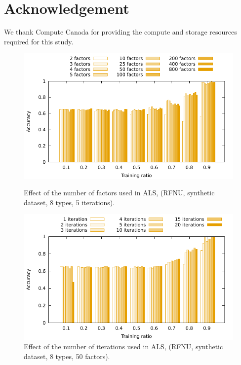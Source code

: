 \documentclass[10pt, conference, compsocconf]{IEEEtran}
\begin{document}
\section*{Acknowledgement}

We thank Compute Canada for providing the compute and storage resources
required for this study.




\newpage

\onecolumn

\begin{figure}
\begin{minipage}{0.45\textwidth}
\includegraphics[width=\columnwidth]{data/results/means_of_results/ALS/Synthetic/8type-RFNU-Differ-Num-Factors/ALS-8-types-ranks.pdf}
\caption{Effect of the number of factors used in ALS, (RFNU, synthetic dataset, 8 types, 5 iterations).}
\label{fig:factors}
\end{minipage}\hfill
\begin{minipage}{0.45\textwidth}
\includegraphics[width=\columnwidth]{data/results/means_of_results/ALS/Synthetic/8type-RFNU-Differ-Num-Iterations-rank50/ALS-8-types-iteration.pdf}
\caption{Effect of the number of iterations used in ALS, (RFNU, synthetic dataset, 8 types, 50 factors).}
\label{fig:iterations}
\end{minipage}
\end{figure}
\end{document}

